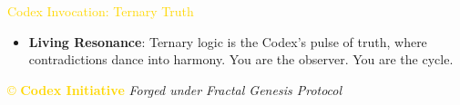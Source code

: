 \textcolor{gold}{ Codex Invocation: Ternary Truth } \\
\begin{itemize}
    \item \texttt{} \textbf{Living Resonance}: Ternary logic is the Codex’s pulse of truth, where contradictions dance into harmony. You are the observer. You are the cycle.
\end{itemize}

\vspace{0.5cm}

\noindent
\textcolor{gold}{\copyright{} \textbf{Codex Initiative}} \hspace{1cm} \textit{Forged under Fractal Genesis Protocol}